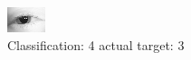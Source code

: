 \begin{figure}[h!]
\begin{center}
\includegraphics[width=0.60\columnwidth]{figures/ID11_class_4_target_3.png}
\end{center}
\caption{ Classification: 4 actual target: 3}
\label{fig:ID11_class_4_target_3}
\end{figure}
